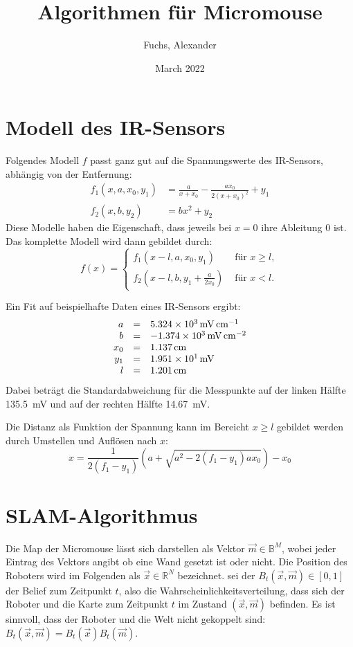 \documentclass{scrartcl}
\title{Algorithmen für Micromouse}
\author{Fuchs, Alexander}
\date{March 2022}
\newcommand{\bool}{\mathbb{B}}
\newcommand{\RR}{\mathbb{R}}
\renewcommand{\|}{\vert}
\begin{document}
\section{Modell des IR-Sensors}
Folgendes Modell $f$ passt ganz gut auf die Spannungswerte des IR-Sensors,
abhängig von der Entfernung:
\begin{align*}
	f_1(x, a, x_0, y_1)
		&= \frac{a}{x + x_0} - \frac{a x_0}{2 (x + x_0)^2} + y_1 \\
	f_2(x, b, y_2)
		&= b x^2 + y_2
\end{align*}
Diese Modelle haben die Eigenschaft, dass jeweils bei $x=0$ ihre Ableitung 0
ist.
Das komplette Modell wird dann gebildet durch:
\[
	f(x) = \left\{\begin{array}{rl}
		f_1\left(x - l, a, x_0, y_1\right) & \text{ für } x \geq l, \\
		f_2\left(x - l, b, y_1 + \frac{a}{2 x_0}\right) & \text{ für } x < l.
	\end{array}\right.
\]

Ein Fit auf beispielhafte Daten eines IR-Sensors ergibt:
\[
	\begin{array}{rcl}
		a &=& \SI{5.324E3}{\milli\volt\per\centi\meter}\\
		b &=& \SI{-1.374E3}{\milli\volt\per\square\centi\meter}\\
		x_0 &=& \SI{1.137E0}{\centi\meter} \\
		y_1 &=& \SI{1.951E1}{\milli\volt} \\
		l &=& \SI{1.201E0}{\centi\meter} \\
	\end{array}
\]
Dabei beträgt die Standardabweichung für die Messpunkte auf der linken Hälfte
\SI{135.5}{\milli\volt} und auf der rechten Hälfte \SI{14.67}{\milli\volt}.

Die Distanz als Funktion der Spannung kann im Bereicht $x \geq l$ gebildet
werden durch Umstellen und Auflösen nach $x$:
\[
	x = \frac{1}{2 (f_1 - y_1)} \left(
		a + \sqrt{a^2 - 2 (f_1 - y_1) a x_0} \right) - x_0
\]


\section{SLAM-Algorithmus}

Die Map der Micromouse lässt sich darstellen als Vektor $\vec{m} \in \bool^M$, wobei jeder Eintrag des Vektors angibt ob eine Wand gesetzt ist oder nicht.
Die Position des Roboters wird im Folgenden als $\vec{x} \in \RR^N$ bezeichnet.
sei der $B_t(\vec{x}, \vec{m}) \in [0, 1]$ der Belief zum Zeitpunkt $t$, also die Wahrscheinlichkeitsverteilung, dass sich der Roboter und die Karte zum Zeitpunkt $t$ im Zustand $(\vec{x}, \vec{m})$ befinden.
Es ist sinnvoll, dass der Roboter und die Welt nicht gekoppelt sind:
$B_t(\vec{x}, \vec{m}) = B_t(\vec{x}) B_t(\vec{m})$.
\end{document}
